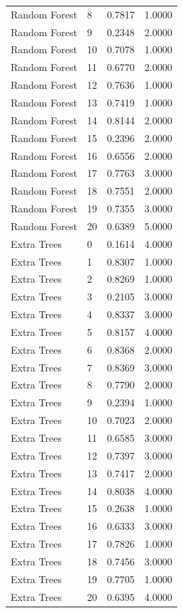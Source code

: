 \begin{tabular}{llll}
Random Forest & 8 & 0.7817 & 1.0000 \\
Random Forest & 9 & 0.2348 & 2.0000 \\
Random Forest & 10 & 0.7078 & 1.0000 \\
Random Forest & 11 & 0.6770 & 2.0000 \\
Random Forest & 12 & 0.7636 & 1.0000 \\
Random Forest & 13 & 0.7419 & 1.0000 \\
Random Forest & 14 & 0.8144 & 2.0000 \\
Random Forest & 15 & 0.2396 & 2.0000 \\
Random Forest & 16 & 0.6556 & 2.0000 \\
Random Forest & 17 & 0.7763 & 3.0000 \\
Random Forest & 18 & 0.7551 & 2.0000 \\
Random Forest & 19 & 0.7355 & 3.0000 \\
Random Forest & 20 & 0.6389 & 5.0000 \\
Extra Trees & 0 & 0.1614 & 4.0000 \\
Extra Trees & 1 & 0.8307 & 1.0000 \\
Extra Trees & 2 & 0.8269 & 1.0000 \\
Extra Trees & 3 & 0.2105 & 3.0000 \\
Extra Trees & 4 & 0.8337 & 3.0000 \\
Extra Trees & 5 & 0.8157 & 4.0000 \\
Extra Trees & 6 & 0.8368 & 2.0000 \\
Extra Trees & 7 & 0.8369 & 3.0000 \\
Extra Trees & 8 & 0.7790 & 2.0000 \\
Extra Trees & 9 & 0.2394 & 1.0000 \\
Extra Trees & 10 & 0.7023 & 2.0000 \\
Extra Trees & 11 & 0.6585 & 3.0000 \\
Extra Trees & 12 & 0.7397 & 3.0000 \\
Extra Trees & 13 & 0.7417 & 2.0000 \\
Extra Trees & 14 & 0.8038 & 4.0000 \\
Extra Trees & 15 & 0.2638 & 1.0000 \\
Extra Trees & 16 & 0.6333 & 3.0000 \\
Extra Trees & 17 & 0.7826 & 1.0000 \\
Extra Trees & 18 & 0.7456 & 3.0000 \\
Extra Trees & 19 & 0.7705 & 1.0000 \\
Extra Trees & 20 & 0.6395 & 4.0000 \\

\end{tabular}
